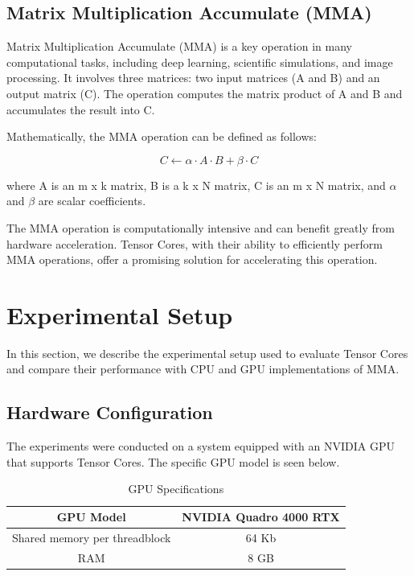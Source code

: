 \documentclass[conference]{IEEEtran}
\begin{document}
  \subsection{Matrix Multiplication Accumulate (MMA)}\label{sec:mma}
  
  Matrix Multiplication Accumulate (MMA) is a key operation in many computational tasks, including deep learning, scientific simulations, and image processing. It involves three matrices: two input matrices (A and B) and an output matrix (C). The operation computes the matrix product of A and B and accumulates the result into C.
  
  Mathematically, the MMA operation can be defined as follows:
  
  \[ C \leftarrow \alpha \cdot A \cdot B + \beta \cdot C \]
  
  where A is an m x k matrix, B is a k x N matrix, C is an m x N matrix, and $\alpha$ and $\beta$ are scalar coefficients.
  
  The MMA operation is computationally intensive and can benefit greatly from hardware acceleration. Tensor Cores, with their ability to efficiently perform MMA operations, offer a promising solution for accelerating this operation.
  
  \section{Experimental Setup}\label{sec:experimental-setup}
  
  In this section, we describe the experimental setup used to evaluate Tensor Cores and compare their performance with CPU and GPU implementations of MMA.
  
  \subsection{Hardware Configuration}\label{sec:hardware-configuration}
  
  The experiments were conducted on a system equipped with an NVIDIA GPU that supports Tensor Cores. The specific GPU model is seen below. %
  
  \begin{table}[htbp]
  \caption{GPU Specifications}\label{tab:gpu-specs}
  \centering
    \begin{tabular}{|c|c|}
    \hline
    GPU Model & NVIDIA Quadro 4000 RTX \\
    \hline
    Shared memory per threadblock & 64 Kb \\
    \hline
    RAM & 8 GB \\
    \hline
  \end{tabular}
  \end{table}
  
\end{document}
